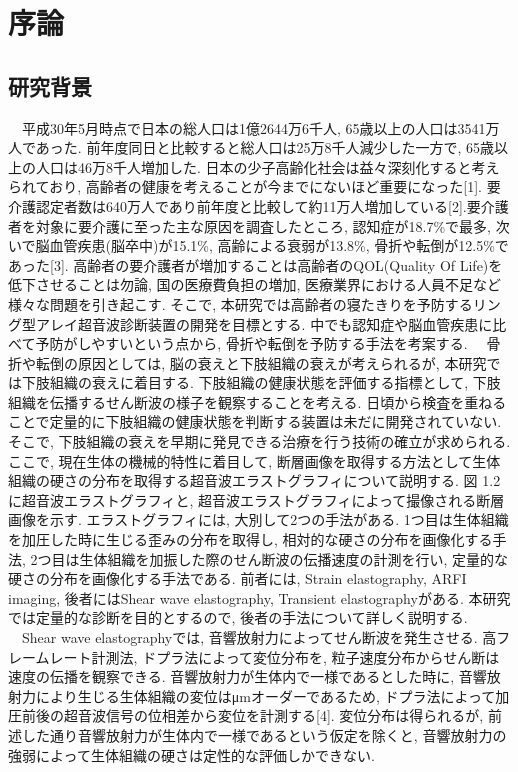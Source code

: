 \chapter{序論}
\section{研究背景}
　平成30年5月時点で日本の総人口は1億2644万6千人, 65歳以上の人口は3541万人であった. 前年度同日と比較すると総人口は25万8千人減少した一方で, 65歳以上の人口は46万8千人増加した. 日本の少子高齢化社会は益々深刻化すると考えられており, 高齢者の健康を考えることが今までにないほど重要になった[1]. 要介護認定者数は640万人であり前年度と比較して約11万人増加している[2].要介護者を対象に要介護に至った主な原因を調査したところ, 認知症が18.7\%で最多, 次いで脳血管疾患(脳卒中)が15.1\%, 高齢による衰弱が13.8\%, 骨折や転倒が12.5\%であった[3]. 高齢者の要介護者が増加することは高齢者のQOL(Quality Of Life)を低下させることは勿論, 国の医療費負担の増加, 医療業界における人員不足など様々な問題を引き起こす. そこで, 本研究では高齢者の寝たきりを予防するリング型アレイ超音波診断装置の開発を目標とする. 中でも認知症や脳血管疾患に比べて予防がしやすいという点から, 骨折や転倒を予防する手法を考案する. 
　骨折や転倒の原因としては, 脳の衰えと下肢組織の衰えが考えられるが, 本研究では下肢組織の衰えに着目する. 下肢組織の健康状態を評価する指標として, 下肢組織を伝播するせん断波の様子を観察することを考える. 日頃から検査を重ねることで定量的に下肢組織の健康状態を判断する装置は未だに開発されていない.そこで, 下肢組織の衰えを早期に発見できる治療を行う技術の確立が求められる. ここで, 現在生体の機械的特性に着目して, 断層画像を取得する方法として生体組織の硬さの分布を取得する超音波エラストグラフィについて説明する. 図 1.2 に超音波エラストグラフィと, 超音波エラストグラフィによって撮像される断層画像を示す. エラストグラフィには, 大別して2つの手法がある. 1つ目は生体組織を加圧した時に生じる歪みの分布を取得し,  相対的な硬さの分布を画像化する手法, 2つ目は生体組織を加振した際のせん断波の伝播速度の計測を行い, 定量的な硬さの分布を画像化する手法である. 前者には, Strain elastography, ARFI imaging, 後者にはShear wave elastography, Transient elastographyがある. 本研究では定量的な診断を目的とするので, 後者の手法について詳しく説明する. 
　Shear wave elastographyでは, 音響放射力によってせん断波を発生させる. 高フレームレート計測法, ドプラ法によって変位分布を, 粒子速度分布からせん断は速度の伝播を観察できる. 音響放射力が生体内で一様であるとした時に, 音響放射力により生じる生体組織の変位はμmオーダーであるため, ドプラ法によって加圧前後の超音波信号の位相差から変位を計測する[4]. 変位分布は得られるが, 前述した通り音響放射力が生体内で一様であるという仮定を除くと, 音響放射力の強弱によって生体組織の硬さは定性的な評価しかできない.
